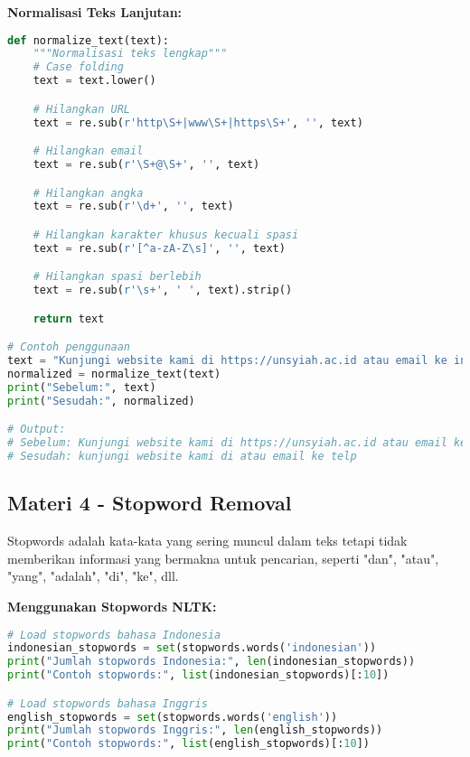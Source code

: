 \textbf{Normalisasi Teks Lanjutan:}
\begin{lstlisting}[language=python, style=python]
def normalize_text(text):
    """Normalisasi teks lengkap"""
    # Case folding
    text = text.lower()

    # Hilangkan URL
    text = re.sub(r'http\S+|www\S+|https\S+', '', text)

    # Hilangkan email
    text = re.sub(r'\S+@\S+', '', text)

    # Hilangkan angka
    text = re.sub(r'\d+', '', text)

    # Hilangkan karakter khusus kecuali spasi
    text = re.sub(r'[^a-zA-Z\s]', '', text)

    # Hilangkan spasi berlebih
    text = re.sub(r'\s+', ' ', text).strip()

    return text

# Contoh penggunaan
text = "Kunjungi website kami di https://unsyiah.ac.id atau email ke info@unsyiah.ac.id. Telp: 0651-123456"
normalized = normalize_text(text)
print("Sebelum:", text)
print("Sesudah:", normalized)

# Output:
# Sebelum: Kunjungi website kami di https://unsyiah.ac.id atau email ke info@unsyiah.ac.id. Telp: 0651-123456
# Sesudah: kunjungi website kami di atau email ke telp
\end{lstlisting}

\subsection*{Materi 4 - Stopword Removal}

Stopwords adalah kata-kata yang sering muncul dalam teks tetapi tidak memberikan informasi yang bermakna untuk pencarian, seperti "dan", "atau", "yang", "adalah", "di", "ke", dll.

\textbf{Menggunakan Stopwords NLTK:}
\begin{lstlisting}[language=python, style=python]
# Load stopwords bahasa Indonesia
indonesian_stopwords = set(stopwords.words('indonesian'))
print("Jumlah stopwords Indonesia:", len(indonesian_stopwords))
print("Contoh stopwords:", list(indonesian_stopwords)[:10])

# Load stopwords bahasa Inggris
english_stopwords = set(stopwords.words('english'))
print("Jumlah stopwords Inggris:", len(english_stopwords))
print("Contoh stopwords:", list(english_stopwords)[:10])
\end{lstlisting}

